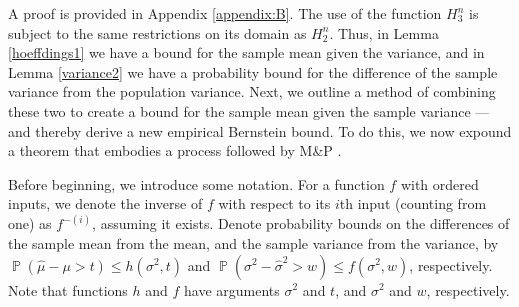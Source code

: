 \documentclass[runningheads, envcountsame, a4paper]{llncs}
\DeclareMathOperator{\p}{\mathbb{P}}
\begin{document}
A proof is provided in Appendix \ref{appendix:B}.
The use of the function $H_3^n$ is subject to the same restrictions on its domain as $H_2^n$.
Thus, in Lemma \ref{hoeffdings1} we have a bound for the sample mean given the variance, and in Lemma \ref{variance2} we have a probability bound for the difference of the sample variance from the population variance. 
Next, we outline a method of combining these two to create a bound for the sample mean given the sample variance --- and thereby derive a new empirical Bernstein bound.
To do this, we now expound a theorem that embodies a process %
followed by M\&P \cite{Maurer50empiricalbernstein}. 

Before beginning, we introduce some notation.
For a function $f$ with ordered inputs, 
we denote the inverse of $f$ with respect to its $i${th} input 
(counting from one) as $f^{-(i)}$, assuming it exists.
Denote probability bounds on the differences of the sample mean from the mean, and the sample variance from the variance, by
$\p(\hat{\mu}-\mu>t)\le h(\sigma^2,t)$ and $\p(\sigma^2-\hat{\sigma}^2>w)\le f(\sigma^2,w)$, respectively.
Note that functions $h$ and $f$ have arguments $\sigma^2$ and $t$, and $\sigma^2$ and $w$, respectively.

\newpage
\end{document}
